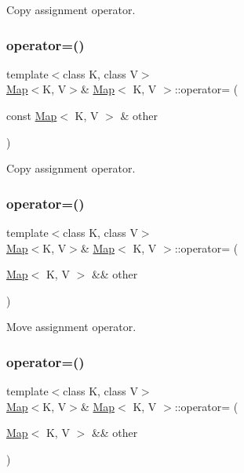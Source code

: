 Copy assignment operator. \mbox{\label{classMap_aa4378eae3c16e838cb1654d6d99bfa0b}} 
\subsubsection{\texorpdfstring{operator=()}{operator=()}\hspace{0.1cm}{\footnotesize\ttfamily [2/4]}}
{\footnotesize\ttfamily template$<$class K, class V$>$ \\
\hyperlink{classMap}{Map}$<$K, V$>$\& \hyperlink{classMap}{Map}$<$ K, V $>$\+::operator= (\begin{DoxyParamCaption}\item[{const \hyperlink{classMap}{Map}$<$ K, V $>$ \&}]{other }\end{DoxyParamCaption})\hspace{0.3cm}{\ttfamily [inline]}}

Copy assignment operator. \mbox{\label{classMap_af08c02bad2e780d9311a57526f0ce088}} 
\subsubsection{\texorpdfstring{operator=()}{operator=()}\hspace{0.1cm}{\footnotesize\ttfamily [3/4]}}
{\footnotesize\ttfamily template$<$class K, class V$>$ \\
\hyperlink{classMap}{Map}$<$K, V$>$\& \hyperlink{classMap}{Map}$<$ K, V $>$\+::operator= (\begin{DoxyParamCaption}\item[{\hyperlink{classMap}{Map}$<$ K, V $>$ \&\&}]{other }\end{DoxyParamCaption})\hspace{0.3cm}{\ttfamily [inline]}}

Move assignment operator. \mbox{\label{classMap_af08c02bad2e780d9311a57526f0ce088}} 
\subsubsection{\texorpdfstring{operator=()}{operator=()}\hspace{0.1cm}{\footnotesize\ttfamily [4/4]}}
{\footnotesize\ttfamily template$<$class K, class V$>$ \\
\hyperlink{classMap}{Map}$<$K, V$>$\& \hyperlink{classMap}{Map}$<$ K, V $>$\+::operator= (\begin{DoxyParamCaption}\item[{\hyperlink{classMap}{Map}$<$ K, V $>$ \&\&}]{other }\end{DoxyParamCaption})\hspace{0.3cm}{\ttfamily [inline]}}

